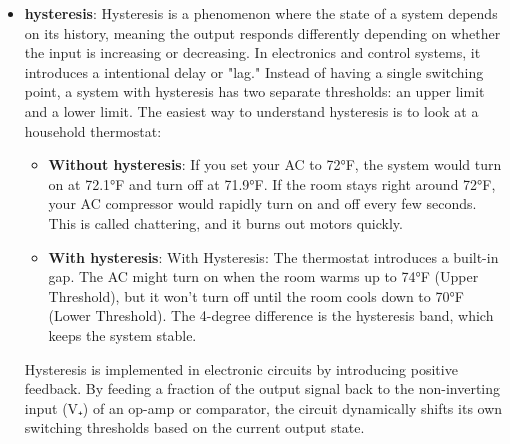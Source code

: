 \documentclass{report}
\begin{document}
\begin{itemize}
\begin{itemize}
                \item \textbf{LOW} when \(V_+\) is less than \(V_-\).
            \end{itemize}
            For the circuit shown, \(V_-\) is a fixed reference voltage and \(V_+\) is the signal being tested:
            \begin{align*}
                V_{\text{out}} = \begin{cases}
                    \text{\textbf{HIGH}} &\quad V_{+} > V_{-} \\
                    \text{\textbf{LOW}} &\quad V_{+} < V_{-}
                \end{cases}
            .\end{align*}
            The output normally approaches the comparator’s supply rails. With a 0–5 V supply, LOW might be approximately 0 V and HIGH approximately 5 V. The exact voltages depend on the component.
            \bigbreak \noindent 
        \item \textbf{hysteresis}: Hysteresis is a phenomenon where the state of a system depends on its history, meaning the output responds differently depending on whether the input is increasing or decreasing.
            \bigbreak \noindent 
            In electronics and control systems, it introduces a intentional delay or "lag." Instead of having a single switching point, a system with hysteresis has two separate thresholds: an upper limit and a lower limit.
            \bigbreak \noindent 
            The easiest way to understand hysteresis is to look at a household thermostat:
            \begin{itemize}
                \item \textbf{Without hysteresis}: If you set your AC to 72°F, the system would turn on at 72.1°F and turn off at 71.9°F. If the room stays right around 72°F, your AC compressor would rapidly turn on and off every few seconds. This is called chattering, and it burns out motors quickly.
                \item \textbf{With hysteresis}: With Hysteresis: The thermostat introduces a built-in gap. The AC might turn on when the room warms up to 74°F (Upper Threshold), but it won't turn off until the room cools down to 70°F (Lower Threshold). The 4-degree difference is the hysteresis band, which keeps the system stable.
            \end{itemize}
            Hysteresis is implemented in electronic circuits by introducing positive feedback. By feeding a fraction of the output signal back to the non-inverting input (V₊) of an op-amp or comparator, the circuit dynamically shifts its own switching thresholds based on the current output state.

\end{itemize}
\end{document}
